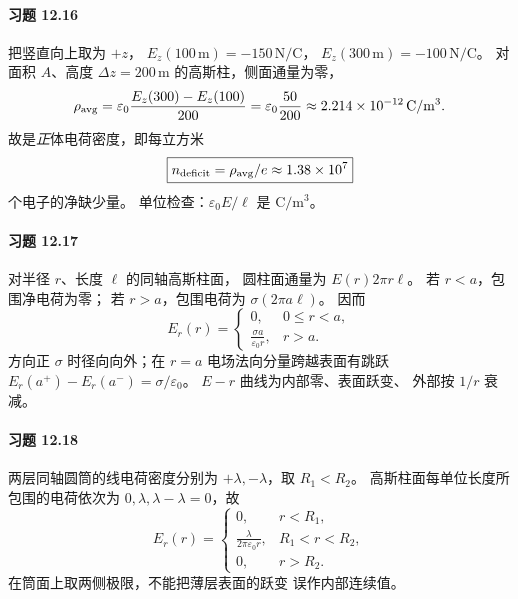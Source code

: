 \paragraph{习题 12.16}
把竖直向上取为 \(+z\)，
\(E_z(100\,\mathrm m)=-150\,\mathrm{N/C}\)，
\(E_z(300\,\mathrm m)=-100\,\mathrm{N/C}\)。
对面积 \(A\)、高度 \(\Delta z=200\,\mathrm m\)
的高斯柱，侧面通量为零，
\[
 \rho_{\rm avg}
 =\varepsilon_0\frac{E_z(300)-E_z(100)}{200}
 =\varepsilon_0\frac{50}{200}
 \approx2.214\times10^{-12}\,\mathrm{C/m^3}.
\]
故是\emph{正}体电荷密度，即每立方米
\[
 \boxed{n_{\rm deficit}=\rho_{\rm avg}/e
 \approx1.38\times10^7}
\]
个电子的净缺少量。
单位检查：\(\varepsilon_0 E/\ell\) 是 \(\mathrm{C/m^3}\)。

\paragraph{习题 12.17}
对半径 \(r\)、长度 \(\ell\) 的同轴高斯柱面，
圆柱面通量为 \(E(r)2\pi r\ell\)。
若 \(r<a\)，包围净电荷为零；
若 \(r>a\)，包围电荷为
\(\sigma(2\pi a\ell)\)。
因而
\[
 \boxed{E_r(r)=
 \begin{cases}
 0,&0\le r<a,\\
 \displaystyle\frac{\sigma a}{\varepsilon_0r},&r>a.
 \end{cases}}
\]
方向正 \(\sigma\) 时径向向外；在 \(r=a\)
电场法向分量跨越表面有跳跃
\(E_r(a^+)-E_r(a^-)=\sigma/\varepsilon_0\)。
\(E-r\) 曲线为内部零、表面跃变、
外部按 \(1/r\) 衰减。

\paragraph{习题 12.18}
两层同轴圆筒的线电荷密度分别为
\(+\lambda,-\lambda\)，取 \(R_1<R_2\)。
高斯柱面每单位长度所包围的电荷依次为
\(0,\lambda,\lambda-\lambda=0\)，故
\[
 \boxed{E_r(r)=
 \begin{cases}
 0,&r<R_1,\\
 \displaystyle\frac{\lambda}{2\pi\varepsilon_0r},
 &R_1<r<R_2,\\
 0,&r>R_2.
 \end{cases}}
\]
在筒面上取两侧极限，不能把薄层表面的跃变
误作内部连续值。

